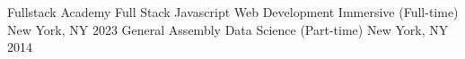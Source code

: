 \begin{cvhonors}
  \cvhonor
    {Fullstack Academy}
    {Full Stack Javascript Web Development Immersive (Full-time)}
    {New York, NY}
    {2023}
  \cvhonor
    {General Assembly}
    {Data Science (Part-time)}
    {New York, NY}
    {2014}
\end{cvhonors}